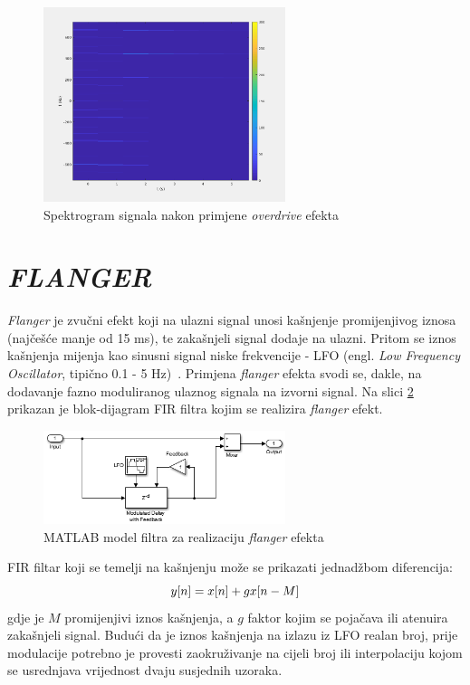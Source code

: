 \documentclass[conference]{IEEEtran}
\begin{document}
\begin{figure}[H]
    \includegraphics[width=200pt]{slike/distorzija_overdrive.png}
    \centering
    \caption{Spektrogram signala nakon primjene \textit{overdrive} efekta}
    \label{distorzija_overdrive}
\end{figure}

\section{\textit{FLANGER}}

\textit{Flanger} je zvučni efekt koji na ulazni signal unosi kašnjenje promijenjivog iznosa (najčešće manje
od 15 ms), te zakašnjeli signal dodaje na ulazni. Pritom se iznos kašnjenja mijenja kao sinusni signal
niske frekvencije - LFO (engl. \textit{Low Frequency Oscillator}, tipično 0.1 - 5 Hz)~\cite{b1}.
Primjena \textit{flanger} efekta svodi se, dakle, na dodavanje fazno moduliranog ulaznog signala na izvorni
signal. Na slici \ref{flang_simulink} prikazan je blok-dijagram FIR filtra kojim se realizira \textit{flanger}
efekt.

\begin{figure}[H]
    \includegraphics[width=200pt]{slike/flanger_simulink.png}
    \centering
    \caption{MATLAB model filtra za realizaciju \textit{flanger} efekta~\cite{b4}}
    \label{flang_simulink}
\end{figure}

FIR filtar koji se temelji na kašnjenju može se prikazati jednadžbom diferencija:
\begin{equation}
  y[n]=x[n]+g\*x[n-M]
  \label{flanger}
\end{equation}
gdje je $M$ promijenjivi iznos kašnjenja, a $g$ faktor kojim se pojačava ili atenuira zakašnjeli signal.
Budući da je iznos kašnjenja na izlazu iz LFO realan broj, prije modulacije potrebno je provesti zaokruživanje
na cijeli broj ili interpolaciju kojom se usrednjava vrijednost dvaju susjednih uzoraka.
\end{document}
